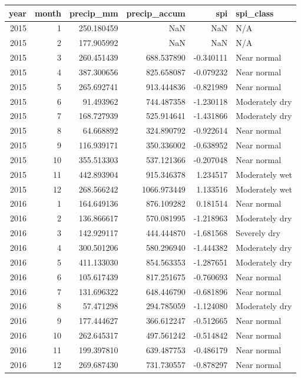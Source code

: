\begin{tabular}{rrrrrl}
\toprule
year & month & precip\_mm & precip\_accum & spi & spi\_class \\
\midrule
2015 & 1 & 250.180459 & NaN & NaN & N/A \\
2015 & 2 & 177.905992 & NaN & NaN & N/A \\
2015 & 3 & 260.451439 & 688.537890 & -0.340111 & Near normal \\
2015 & 4 & 387.300656 & 825.658087 & -0.079232 & Near normal \\
2015 & 5 & 265.692741 & 913.444836 & -0.821989 & Near normal \\
2015 & 6 & 91.493962 & 744.487358 & -1.230118 & Moderately dry \\
2015 & 7 & 168.727939 & 525.914641 & -1.431866 & Moderately dry \\
2015 & 8 & 64.668892 & 324.890792 & -0.922614 & Near normal \\
2015 & 9 & 116.939171 & 350.336002 & -0.638952 & Near normal \\
2015 & 10 & 355.513303 & 537.121366 & -0.207048 & Near normal \\
2015 & 11 & 442.893904 & 915.346378 & 1.234517 & Moderately wet \\
2015 & 12 & 268.566242 & 1066.973449 & 1.133516 & Moderately wet \\
2016 & 1 & 164.649136 & 876.109282 & 0.181514 & Near normal \\
2016 & 2 & 136.866617 & 570.081995 & -1.218963 & Moderately dry \\
2016 & 3 & 142.929117 & 444.444870 & -1.681568 & Severely dry \\
2016 & 4 & 300.501206 & 580.296940 & -1.444382 & Moderately dry \\
2016 & 5 & 411.133030 & 854.563353 & -1.287651 & Moderately dry \\
2016 & 6 & 105.617439 & 817.251675 & -0.760693 & Near normal \\
2016 & 7 & 131.696322 & 648.446790 & -0.681896 & Near normal \\
2016 & 8 & 57.471298 & 294.785059 & -1.124080 & Moderately dry \\
2016 & 9 & 177.444627 & 366.612247 & -0.512665 & Near normal \\
2016 & 10 & 262.645317 & 497.561242 & -0.514842 & Near normal \\
2016 & 11 & 199.397810 & 639.487753 & -0.486179 & Near normal \\
2016 & 12 & 269.687430 & 731.730557 & -0.878297 & Near normal \\

\end{tabular}
